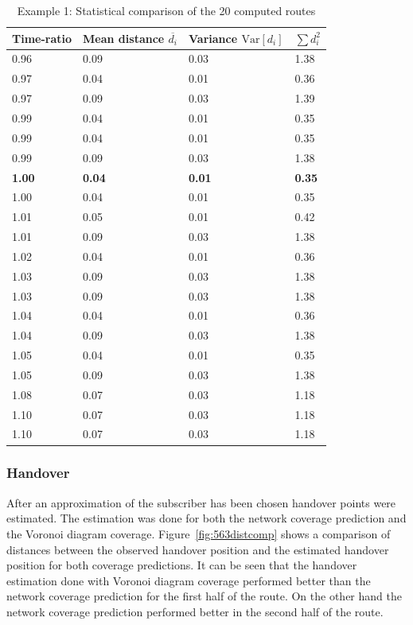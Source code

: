 \documentclass[master,english]{hgbthesis}
\begin{document}
\begin{table}
\centering
\begin{tabular}{l|l|l|l}
Time-ratio & Mean distance $\overline{d_i}$ & Variance $\mathrm{Var}[d_i]$& $\sum {d}_{i}^{2}$ \\
\hline
0.96 & 0.09 & 0.03 & 1.38 \\
0.97 & 0.04 & 0.01 & 0.36 \\
0.97 & 0.09 & 0.03 & 1.39 \\
0.99 & 0.04 & 0.01 & 0.35 \\
0.99 & 0.04 & 0.01 & 0.35 \\
0.99 & 0.09 & 0.03 & 1.38 \\
\textbf{1.00} & \textbf{0.04 }& \textbf{0.01} & \textbf{0.35} \\
1.00 & 0.04 & 0.01 & 0.35 \\
1.01 & 0.05 & 0.01 & 0.42 \\
1.01 & 0.09 & 0.03 & 1.38 \\
1.02 & 0.04 & 0.01 & 0.36 \\
1.03 & 0.09 & 0.03 & 1.38 \\
1.03 & 0.09 & 0.03 & 1.38 \\
1.04 & 0.04 & 0.01 & 0.36 \\
1.04 & 0.09 & 0.03 & 1.38 \\
1.05 & 0.04 & 0.01 & 0.35 \\
1.05 & 0.09 & 0.03 & 1.38 \\
1.08 & 0.07 & 0.03 & 1.18 \\
1.10 & 0.07 & 0.03 & 1.18 \\
1.10 & 0.07 & 0.03 & 1.18
\end{tabular}
\caption{Example 1:  Statistical comparison of the 20 computed routes}
\label{tab:563route}
\end{table}
\subsubsection{Handover}
After an approximation of the subscriber has been chosen handover points were estimated. The estimation was done for both the network coverage prediction and the Voronoi diagram coverage. Figure~\ref{fig:563distcomp} shows a comparison of distances between the observed handover position and the estimated handover position for both coverage predictions. It can be seen that the handover estimation done with Voronoi diagram coverage performed better than the network coverage prediction for the first half of the route. On the other hand the network coverage prediction performed better in the second half of the route.
\end{document}
